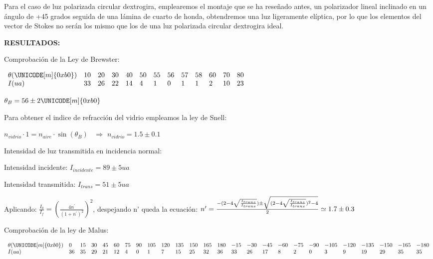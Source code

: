 \documentclass[12pt,thmsa]{article}
\begin{document}
Para el caso de luz polarizada circular dextrogira, emplearemos el montaje
que se ha rese\~{n}ado antes, un polarizador lineal inclinado en un
\'{a}ngulo de +45 grados seguida de una l\'{a}mina de cuarto de honda,
obtendremos una luz ligeramente el\'{i}ptica, por lo que los elementos del
vector de Stokes no ser\'{a}n los mismo que los de una luz polarizada
circular dextrogira ideal.

\vspace{1pt}

\textbf{RESULTADOS:}

Comprobaci\'{o}n de la Ley de Brewster:

$
\begin{array}{lllllllllllll}
\theta (\UNICODE[m]{0xb0}) & 10 & 20 & 30 & 40 & 50 & 55 & 56 & 57 & 58 & 60
& 70 & 80 \\ 
I(ua) & 33 & 26 & 22 & 14 & 4 & 1 & 0 & 1 & 1 & 2 & 10 & 23
\end{array}
$

$\theta _{B}=56\pm 2\UNICODE[m]{0xb0}$

Para obtener el indice de refracci\'{o}n del vidrio empleamos la ley de
Snell:

$n_{vidrio}\cdot 1=n_{aire}\cdot \sin (\theta _{B})$ \ $\Longrightarrow $ $%
n_{vidrio}=1.5\pm 0.1$

Intensidad de luz transmitida en incidencia normal:

Intensidad incidente: $I_{incidente}=89\pm 5ua$

Intensidad transmitida: $I_{trans}=51\pm 5ua$

\vspace{1pt}

Aplicando: $\frac{I_{0}}{I_{f}}=\left( \frac{4n^{\prime }}{(1+n^{\prime
})^{2}}\right) ^{2}$, despejando n' queda la ecuaci\'{o}n: $n^{\prime }=%
\frac{-(2-4\sqrt{\frac{I_{trans}}{I_{trans}}})\pm \sqrt{(2-4\sqrt{\frac{%
I_{trans}}{I_{trans}}})^{2}-4}}{2}\simeq 1.7\pm 0.3$

\vspace{1pt}

Comprobaci\'{o}n de la ley de Malus:

$
\begin{array}{llllllllllllllllllllllllll}
\theta (\UNICODE[m]{0xb0}) & 0 & 15 & 30 & 45 & 60 & 75 & 90 & 105 & 120 & 
135 & 150 & 165 & 180 & -15 & -30 & -45 & -60 & -75 & -90 & -105 & -120 & 
-135 & -150 & -165 & -180 \\ 
I(ua) & 36 & 35 & 29 & 21 & 12 & 4 & 0 & 1 & 7 & 15 & 25 & 32 & 36 & 33 & 26
& 17 & 8 & 2 & 0 & 3 & 9 & 19 & 29 & 35 & 35
\end{array}
$
\end{document}
